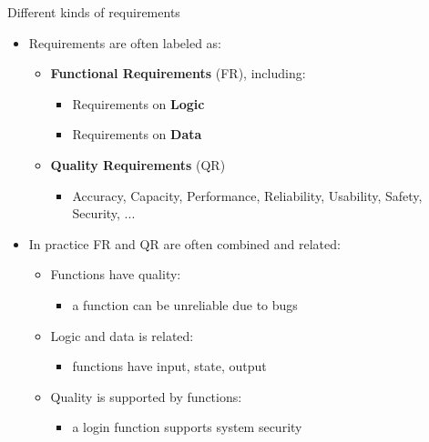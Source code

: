 
\begin{Slide}{Different kinds of requirements}

\begin{itemize}
\item Requirements are often labeled as:
\begin{itemize}
\item \textbf{Functional Requirements} (FR), including:
\begin{itemize}
\item Requirements on \textbf{Logic}
\item Requirements on \textbf{Data}
\end{itemize}
\item \textbf{Quality Requirements} (QR)
\begin{itemize}
\item Accuracy, Capacity, Performance, Reliability, Usability, Safety, Security, ...
\end{itemize}
\end{itemize}
\item In practice FR and QR are often combined and related:
\begin{itemize}
\item Functions have quality:
\begin{itemize}
\item a function can be unreliable due to bugs 
\end{itemize}
\item Logic and data is related: 
\begin{itemize}
\item functions have input, state, output
\end{itemize}
\item Quality is supported by functions: 
\begin{itemize}
\item a login function supports system security


\end{itemize}
\end{itemize}
\end{itemize}
\end{Slide}